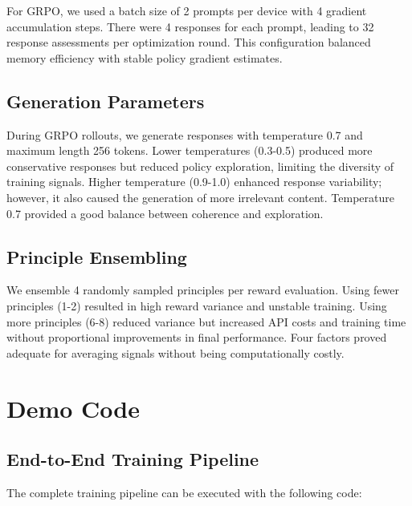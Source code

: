 \documentclass[conference]{IEEEtran}
\begin{document}
For GRPO, we used a batch size of 2 prompts per device with 4 gradient accumulation steps. There were 4 responses for each prompt, leading to 32 response assessments per optimization round. This configuration balanced memory efficiency with stable policy gradient estimates.

\subsection{Generation Parameters}

During GRPO rollouts, we generate responses with temperature 0.7 and maximum length 256 tokens. Lower temperatures (0.3-0.5) produced more conservative responses but reduced policy exploration, limiting the diversity of training signals. Higher temperature (0.9-1.0) enhanced response variability; however, it also caused the generation of more irrelevant content. Temperature 0.7 provided a good balance between coherence and exploration.

\subsection{Principle Ensembling}

We ensemble 4 randomly sampled principles per reward evaluation. Using fewer principles (1-2) resulted in high reward variance and unstable training. Using more principles (6-8) reduced variance but increased API costs and training time without proportional improvements in final performance. Four factors proved adequate for averaging signals without being computationally costly.


\section{Demo Code}

\subsection{End-to-End Training Pipeline}

The complete training pipeline can be executed with the following code:
\end{document}
